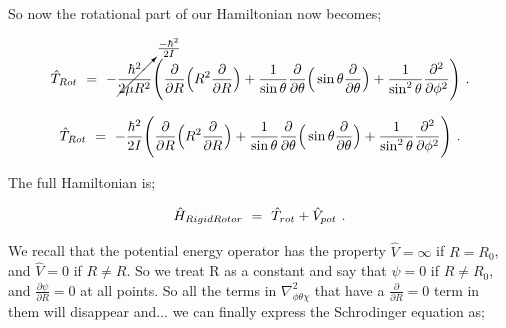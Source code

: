 \documentclass{article}
\begin{document}
So now the rotational part of our Hamiltonian now becomes; 

\begin{equation} \label{eb-eq-256-46}
\hat{T}_{Rot} \hspace{0.125cm} = \hspace{0.125cm} - \cancelto{\frac{- \hbar^{2}}{2 I}}{\frac{\hbar^{2}}{2 \mu R^2}} \Bigg( \frac{\partial}{\partial{R}}\Big( R^2 \frac{\partial}{\partial{R}}\Big) + \frac{1}{\sin{\theta}} \frac{\partial}{\partial{\theta}}\Big(\sin{\theta}\frac{\partial}{\partial{\theta}}\Big) + \frac{1}{\sin^{2}{\theta}} \frac{\partial^{2}}{\partial{\phi}^{2}} \Bigg) \hspace{0.125cm} .
\end{equation}

\begin{equation} \label{eb-eq-256-47}
\hat{T}_{Rot} \hspace{0.125cm} = \hspace{0.125cm} -\frac{\hbar^{2}}{2 I} \Bigg(\frac{\partial}{\partial{R}}\Big( R^2 \frac{\partial}{\partial{R}}\Big) + \frac{1}{\sin{\theta}} \frac{\partial}{\partial{\theta}}\Big(\sin{\theta}\frac{\partial}{\partial{\theta}}\Big) + \frac{1}{\sin^{2}{\theta}} \frac{\partial^{2}}{\partial{\phi}^{2}} \Bigg) \hspace{0.125cm} .
\end{equation}

The full Hamiltonian is;

\begin{equation} \label{eb-eq-256-48}
\hat{H}_{RigidRotor} \hspace{0.125cm} = \hspace{0.125cm} \hat{T}_{rot} + \hat{V}_{pot} \hspace{0.125cm}. 
\end{equation}

We recall that the potential energy operator has the property \begin{math} \hat{V} = \infty \end{math} if \begin{math} R = R_0 \end{math}, and \begin{math} \hat{V} = 0 \end{math} if \begin{math} R  \neq R \end{math}. So we treat R as a constant and say that \begin{math} \psi = 0 \end{math} if \begin{math} R \neq R_0 \end{math}, and \begin{math} \frac{\partial{\psi}}{\partial{R}} = 0 \end{math} at all points. So all the terms in \begin{math} \nabla_{\phi \theta \chi}^{2} \end{math} that have a \begin{math} \frac{\partial}{\partial{R}} = 0 \end{math} term in them will disappear and... we can finally express the Schrodinger equation as;
\end{document}
